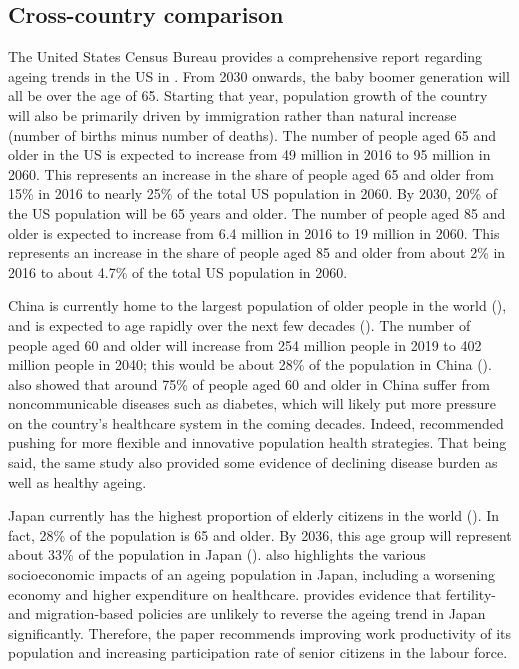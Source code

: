 \documentclass[11pt]{article}
\begin{document}
\subsection*{Cross-country comparison}
\label{subsec:crosscountrycomparison}

The United States Census Bureau provides a comprehensive report regarding ageing trends in the US in \cite{vespa2018demographic}. From 2030 onwards, the baby boomer generation will all be over the age of 65. Starting that year, population growth of the country will also be primarily driven by immigration rather than natural increase (number of births minus number of deaths). The number of people aged 65 and older in the US is expected to increase from 49 million in 2016 to 95 million in 2060. This represents an increase in the share of people aged 65 and older from 15\% in 2016 to nearly 25\% of the total US population in 2060. By 2030, 20\% of the US population will be 65 years and older. The number of people aged 85 and older is expected to increase from 6.4 million in 2016 to 19 million in 2060. This represents an increase in the share of people aged 85 and older from about 2\% in 2016 to about 4.7\% of the total US population in 2060.

China is currently home to the largest population of older people in the world (\cite{lancet2022population}), and is expected to age rapidly over the next few decades (\cite{BeardsonTimothy2021Ag:C}). The number of people aged 60 and older will increase from 254 million people in 2019 to 402 million people in 2040; this would be about 28\% of the population in China (\cite{whochina}). \cite{whochina} also showed that around 75\% of people aged 60 and older in China suffer from noncommunicable diseases such as diabetes, which will likely put more pressure on the country's healthcare system in the coming decades. Indeed, \cite{LuoYanan2021TaCf} recommended pushing for more flexible and innovative population health strategies. That being said, the same study also provided some evidence of declining disease burden as well as healthy ageing.

Japan currently has the highest proportion of elderly citizens in the world (\cite{kyodo_2019}). In fact, 28\% of the population is 65 and older. By 2036, this age group will represent about 33\% of the population in Japan (\cite{d2020japan}). \cite{d2020japan} also highlights the various socioeconomic impacts of an ageing population in Japan, including a worsening economy and higher expenditure on healthcare. \cite{ParsonsAlexanderJ.Q.2018Aeof} provides evidence that fertility- and migration-based policies are unlikely to reverse the ageing trend in Japan significantly. Therefore, the paper recommends improving work productivity of its population and increasing participation rate of senior citizens in the labour force.
\end{document}
